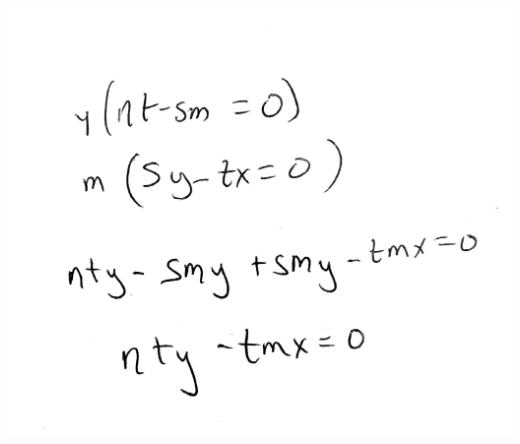 \documentclass[12pt]{amsart}
\begin{document}

\begin{center}
  \includegraphics[width=0.5\linewidth]{scratch}
\end{center}
\end{document}
